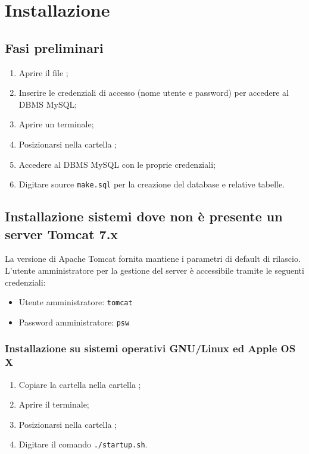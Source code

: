 \section{Installazione}{

\subsection{Fasi preliminari}{
\begin{enumerate}
	\item Aprire il file ;
	\item Inserire le credenziali di accesso (nome utente e password) per accedere al DBMS MySQL;
	\item Aprire un terminale;
	\item Posizionarsi nella cartella ;
	\item Accedere al DBMS MySQL con le proprie credenziali;
	\item Digitare source \texttt{make.sql} per la creazione del database e relative tabelle.
\end{enumerate}

}

\subsection{Installazione sistemi dove non è presente un server Tomcat 7.x}{
La versione di Apache Tomcat fornita mantiene i parametri di default di rilascio. L'utente amministratore per la gestione del server è accessibile tramite le seguenti credenziali:
\begin{itemize}
	\item Utente amministratore: \texttt{tomcat}
	\item Password amministratore: \texttt{psw}
\end{itemize}

	\subsubsection{Installazione su sistemi operativi GNU/Linux ed Apple OS X}{
		\begin{enumerate}
			\item Copiare la cartella  nella cartella ;
			\item Aprire il terminale;
			\item Posizionarsi nella cartella ;
			\item Digitare il comando \texttt{./startup.sh}.
		\end{enumerate}
	}
	
}}
